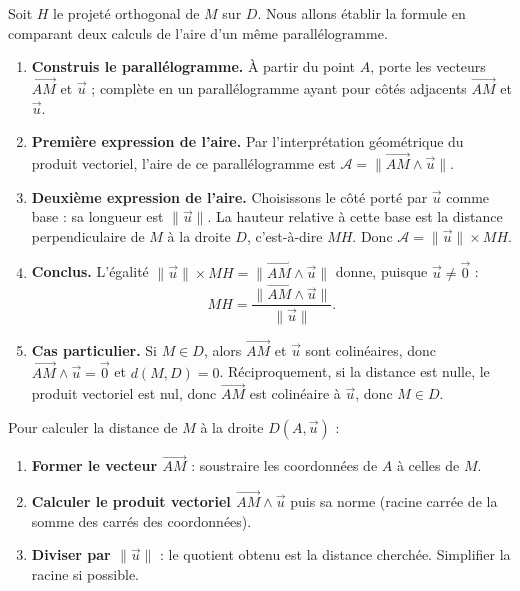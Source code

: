 \documentclass[11pt]{article}
\begin{document}
\begin{experience}
Soit $H$ le projeté orthogonal de $M$ sur $D$. Nous allons établir la formule en comparant deux calculs de l'aire d'un même parallélogramme.
\begin{enumerate}
\item \textbf{Construis le parallélogramme.} À partir du point $A$, porte les vecteurs $\overrightarrow{AM}$ et $\vec{u}$ ; complète en un parallélogramme ayant pour côtés adjacents $\overrightarrow{AM}$ et $\vec{u}$.
\item \textbf{Première expression de l'aire.} Par l'interprétation géométrique du produit vectoriel, l'aire de ce parallélogramme est $\mathcal{A} = \|\overrightarrow{AM} \wedge \vec{u}\|$.
\item \textbf{Deuxième expression de l'aire.} Choisissons le côté porté par $\vec{u}$ comme base : sa longueur est $\|\vec{u}\|$. La hauteur relative à cette base est la distance perpendiculaire de $M$ à la droite $D$, c'est-à-dire $MH$. Donc $\mathcal{A} = \|\vec{u}\| \times MH$.
\item \textbf{Conclus.} L'égalité $\|\vec{u}\| \times MH = \|\overrightarrow{AM} \wedge \vec{u}\|$ donne, puisque $\vec{u} \neq \vec{0}$ :
\[ MH = \frac{\|\overrightarrow{AM} \wedge \vec{u}\|}{\|\vec{u}\|}. \]
\item \textbf{Cas particulier.} Si $M \in D$, alors $\overrightarrow{AM}$ et $\vec{u}$ sont colinéaires, donc $\overrightarrow{AM} \wedge \vec{u} = \vec{0}$ et $d(M, D) = 0$. Réciproquement, si la distance est nulle, le produit vectoriel est nul, donc $\overrightarrow{AM}$ est colinéaire à $\vec{u}$, donc $M \in D$.
\end{enumerate}
\end{experience}

\begin{methode}
Pour calculer la distance de $M$ à la droite $D(A, \vec{u})$ :
\begin{enumerate}
\item \textbf{Former le vecteur $\overrightarrow{AM}$} : soustraire les coordonnées de $A$ à celles de $M$.
\item \textbf{Calculer le produit vectoriel $\overrightarrow{AM} \wedge \vec{u}$} puis sa norme (racine carrée de la somme des carrés des coordonnées).
\item \textbf{Diviser par $\|\vec{u}\|$} : le quotient obtenu est la distance cherchée. Simplifier la racine si possible.
\end{enumerate}
\end{methode}
\end{document}
